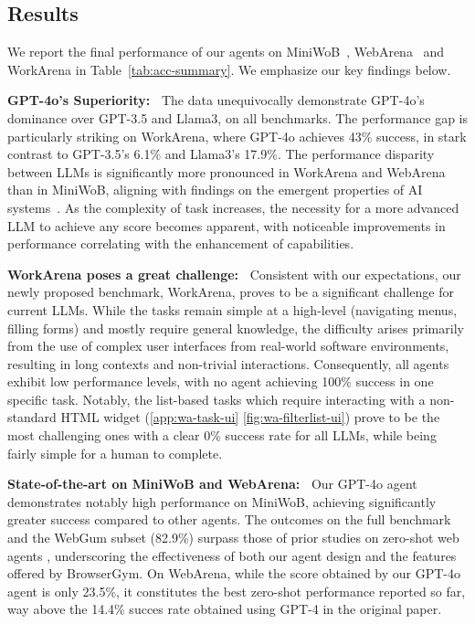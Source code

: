 \documentclass{article}
\theoremstyle{plain}
\theoremstyle{definition}
\theoremstyle{remark}
\newcommand{\paragraphtight}[1]{\textbf{#1~}}
\begin{document}
\subsection{Results}

We report the final performance of our agents on MiniWoB~\citep{LiuL18MiniWoB}, WebArena~\citep{zhou2023webarena} and WorkArena in Table~\ref{tab:acc-summary}. We emphasize our key findings below.


\paragraphtight{GPT-4o's Superiority:} The data unequivocally demonstrate GPT-4o's dominance over GPT-3.5 and Llama3, on all benchmarks.  The performance gap is particularly striking on WorkArena, where GPT-4o achieves 43\% success, in stark contrast to GPT-3.5's 6.1\% and Llama3's 17.9\%. The performance disparity between LLMs is significantly more pronounced in WorkArena and WebArena than in MiniWoB, aligning with findings on the emergent properties of AI systems~\citep{wei2022emergent}. As the complexity of task increases, the necessity for a more advanced LLM to achieve any score becomes apparent, with noticeable improvements in performance correlating with the enhancement of capabilities.

\paragraphtight{WorkArena poses a great challenge:} Consistent with our expectations, our newly proposed benchmark, WorkArena, proves to be a significant challenge for current LLMs. While the tasks remain simple at a high-level (navigating menus, filling forms) and mostly require general knowledge, the difficulty arises primarily from the use of complex user interfaces from real-world software environments, resulting in long contexts and non-trivial interactions. Consequently, all agents exhibit low performance levels, with no agent achieving 100\% success in one specific task. Notably, the list-based tasks which require interacting with a non-standard HTML widget (\cref{app:wa-task-ui} \cref{fig:wa-filterlist-ui}) prove to be the most challenging ones with a clear 0\% success rate for all LLMs, while being fairly simple for a human to complete.

\paragraphtight{State-of-the-art on MiniWoB and WebArena:} Our GPT-4o agent demonstrates notably high performance on MiniWoB, achieving significantly greater success compared to other agents. The outcomes on the full benchmark and the WebGum subset (82.9\%) surpass those of prior studies on zero-shot web agents \citep{assouel2023the,zeng2023agenttuning}, underscoring the effectiveness of both our agent design and the features offered by BrowserGym. On WebArena, while the score obtained by our GPT-4o agent is only 23.5\%, it constitutes the best zero-shot performance reported so far, way above the 14.4\% succes rate obtained  using GPT-4 in the original paper\citep{zhou2023webarena}.
\end{document}
